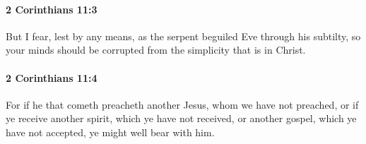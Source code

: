 		\paragraph{2 Corinthians 11:3} %
			\label{2CORINTHIANS-11-3}

			But I fear, lest by any means, as the serpent beguiled Eve through his subtilty, so your minds should be corrupted from the simplicity that is in Christ.

			\begin{framed}
			\scriptsize
				\begin{compactdesc}
					\item[SBLG] 
				\end{compactdesc}
			\end{framed}

		\paragraph{2 Corinthians 11:4} %
			\label{2CORINTHIANS-11-4}

			For if he that cometh preacheth another Jesus, whom we have not preached, or if ye receive another spirit, which ye have not received, or another gospel, which ye have not accepted, ye might well bear with him.

